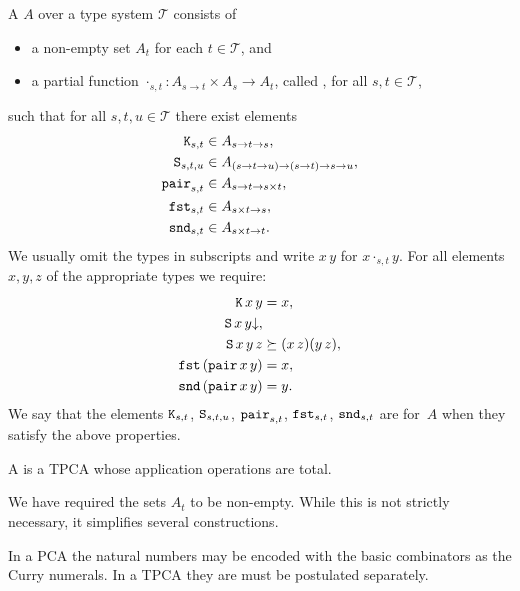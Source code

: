 \begin{definition}
  A  $A$ over a type system $\mathcal{T}$ consists of
  \begin{itemize}
  \item a non-empty set $A_t$ for each $t \in \mathcal{T}$, and
  \item a partial function $\cdot_{s,t} : A_{s \to t} \times A_s \to
    A_t$, called , for all $s, t \in \mathcal{T}$,
  \end{itemize}
  such that for all $s, t, u \in \mathcal{T}$ there exist elements
  \begin{align*}
    \mathtt{K}_{s,t} &\in A_{s \to t \to s}, \\
    \mathtt{S}_{s,t,u} &\in A_{(s \to t \to u) \to (s \to t) \to s \to u}, \\
    \mathtt{pair}_{s,t} &\in A_{s \to t \to s \times t}, \\
    \mathtt{fst}_{s,t} &\in A_{s \times t \to s}, \\
    \mathtt{snd}_{s,t} &\in A_{s \times t \to t}.
  \end{align*}
  We usually omit the types in subscripts and write $x \, y$ for $x \cdot_{s,t} y$.
  For all elements $x, y, z$ of the appropriate types we require:
  \begin{align*}
    \mathtt{K} \, x \, y &= x, \\
    \mathtt{S} \, x \, y{\downarrow}, & \\
    \mathtt{S} \, x \, y \, z &\succeq  (x \, z) (y \, z), \\
    \mathtt{fst} \, (\mathtt{pair} \, x \, y) &= x, \\
    \mathtt{snd} \, (\mathtt{pair} \, x \, y) &= y.
  \end{align*}
  We say that the elements $\mathtt{K}_{s,t}$, $\mathtt{S}_{s,t,u}$,
  $\mathtt{pair}_{s,t}$, $\mathtt{fst}_{s,t}$, $\mathtt{snd}_{s,t}$ are
   for~$A$ when they satisfy the above properties.

  A  is a TPCA whose application operations are total.
\end{definition}

We have required the sets $A_t$ to be non-empty. While this is not
strictly necessary, it simplifies several constructions.

In a PCA the natural numbers may be encoded with the basic combinators as the Curry numerals. In a TPCA they are must be postulated separately.

